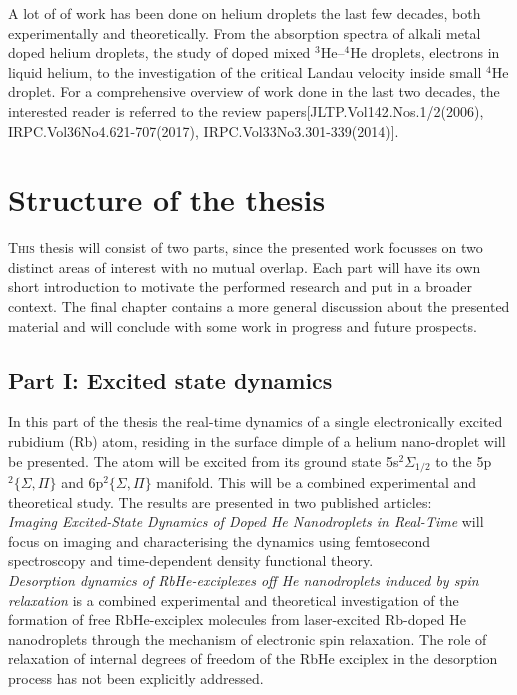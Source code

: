 \documentclass[12pt,a4paper,twosides]{book}
\begin{document}
		A lot of of work has been done on helium droplets the last few decades, both experimentally and theoretically. From the absorption spectra of alkali metal doped helium droplets, the study of doped mixed $^3$He--$^4$He droplets, electrons in liquid helium, to the investigation of the critical Landau velocity inside small $^4$He droplet. For a comprehensive overview of work done in the last two decades, the interested reader is referred to the review papers[JLTP.Vol142.Nos.1/2(2006), IRPC.Vol36No4.621-707(2017), IRPC.Vol33No3.301-339(2014)].

	\clearpage
	\section{Structure of the thesis}
		\lettrine[lines=3,findent=3pt,nindent=0pt]{T}{his} thesis will consist of two parts, since the presented work focusses on two distinct areas of interest with no mutual overlap. Each part will have its own short introduction to motivate the performed research and put in a broader context. The final chapter contains a more general discussion about the presented material and will conclude with some work in progress and future prospects.

		\subsection{Part I: Excited state dynamics}
			In this part of the thesis the real-time dynamics of a single electronically excited rubidium (Rb) atom, residing in the surface dimple of a helium nano-droplet will be presented. The atom will be excited from its ground state 5s$^2\Sigma_{1/2}$ to the 5p$^2\{\Sigma,\Pi\}$ and 6p$^2\{\Sigma,\Pi\}$ manifold. This will be a combined experimental and theoretical study. The results are presented in two published articles:\\
		
			\emph{Imaging Excited-State Dynamics of Doped He Nanodroplets in Real-Time} will focus on imaging and characterising the dynamics using femtosecond spectroscopy and  time-dependent density functional theory.\\
		
			\emph{Desorption dynamics of RbHe-exciplexes off He nanodroplets induced by spin relaxation} is a combined experimental and theoretical investigation of the formation of free RbHe-exciplex molecules from laser-excited Rb-doped He nanodroplets through the mechanism of electronic spin relaxation. The role of relaxation of internal degrees of freedom of the RbHe exciplex in the desorption process has not been explicitly addressed.
\end{document}
